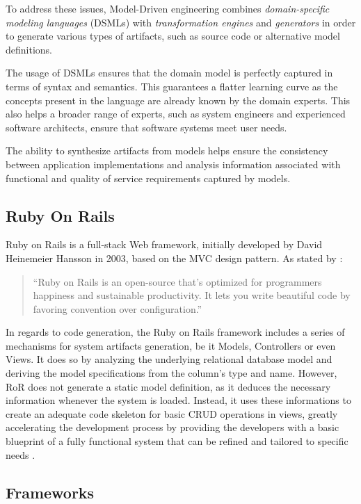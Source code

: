 To address these issues, Model-Driven engineering combines \emph{domain-specific modeling languages} (DSMLs) with \emph{transformation engines} and \emph{generators} in order to generate various types of artifacts, such as source code or alternative model definitions.

The usage of DSMLs ensures that the domain model is perfectly captured in terms of syntax and semantics. This guarantees a flatter learning curve as the concepts present in the language are already known by the domain experts. This also helps a broader range of experts, such as system engineers and experienced software architects, ensure that software systems meet user needs.

The ability to synthesize artifacts from models helps ensure the consistency between application implementations and analysis information associated with functional and quality of service requirements captured by models.

\subsection{Ruby On Rails}\label{sec:ror}

Ruby on Rails is a full-stack Web framework, initially developed by David Heinemeier Hansson in 2003, based on the MVC design pattern. As stated by \cite{rubyonrails}:

\begin{quote}
  ``Ruby on Rails is an open-source that's optimized for programmers happiness and sustainable productivity. It lets you write beautiful code by favoring convention over configuration.''
\end{quote}

In regards to code generation, the Ruby on Rails framework includes a series of mechanisms for system artifacts generation, be it Models, Controllers or even Views. It does so by analyzing the underlying relational database model and deriving the model specifications from the column's type and name. However, RoR does not generate a static model definition, as it deduces the necessary information whenever the system is loaded. Instead, it uses these informations to create an adequate code skeleton for basic CRUD operations in views, greatly accelerating the development process by providing the developers with a basic blueprint of a fully functional system that can be refined and tailored to specific needs \cite{rails_generators}.

\subsection{Frameworks}\label{sec:frameworks}

